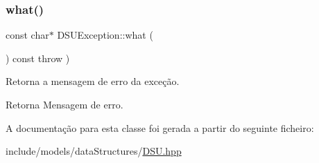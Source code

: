 \subsubsection{\texorpdfstring{what()}{what()}}
{\footnotesize\ttfamily const char$\ast$ D\+S\+U\+Exception\+::what (\begin{DoxyParamCaption}{ }\end{DoxyParamCaption}) const throw  ) \hspace{0.3cm}{\ttfamily [inline]}}

Retorna a mensagem de erro da exceção. \begin{DoxyReturn}{Retorna}
Mensagem de erro. 
\end{DoxyReturn}


A documentação para esta classe foi gerada a partir do seguinte ficheiro\+:\begin{DoxyCompactItemize}
\item 
include/models/data\+Structures/\hyperlink{DSU_8hpp}{D\+S\+U.\+hpp}\end{DoxyCompactItemize}
